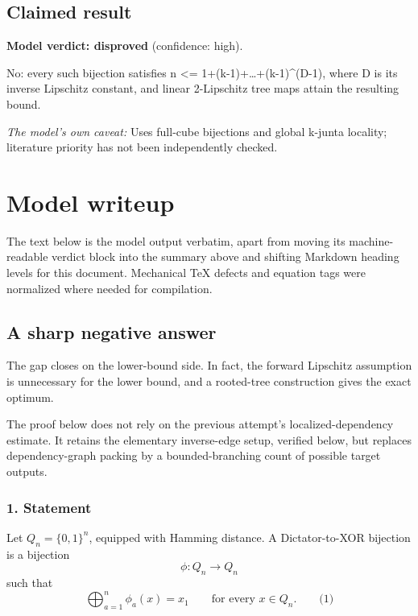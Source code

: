 \documentclass[
  11pt,
  a4paper,
]{article}
\begin{document}
\subsection{Claimed result}\label{claimed-result}

\textbf{Model verdict: disproved} (confidence: high).

No: every such bijection satisfies n \textless=
1+(k-1)+\ldots+(k-1)\^{}(D-1), where D is its inverse Lipschitz
constant, and linear 2-Lipschitz tree maps attain the resulting bound.

\emph{The model's own caveat:} Uses full-cube bijections and global
k-junta locality; literature priority has not been independently
checked.

\section{Model writeup}\label{model-writeup}

The text below is the model output verbatim, apart from moving its
machine-readable verdict block into the summary above and shifting
Markdown heading levels for this document. Mechanical TeX defects and
equation tags were normalized where needed for compilation.

\subsection{A sharp negative answer}\label{a-sharp-negative-answer}

The gap closes on the lower-bound side. In fact, the forward Lipschitz
assumption is unnecessary for the lower bound, and a rooted-tree
construction gives the exact optimum.

The proof below does not rely on the previous attempt's
localized-dependency estimate. It retains the elementary inverse-edge
setup, verified below, but replaces dependency-graph packing by a
bounded-branching count of possible target outputs.

\subsubsection{1. Statement}\label{statement}

Let \(Q_n=\{0,1\}^n\), equipped with Hamming distance. A Dictator-to-XOR
bijection is a bijection \[
\phi:Q_n\longrightarrow Q_n
\] such that \[
\bigoplus_{a=1}^n\phi_a(x)=x_1
\qquad\text{for every }x\in Q_n.                     \qquad\text{(1)}
\]
\end{document}
